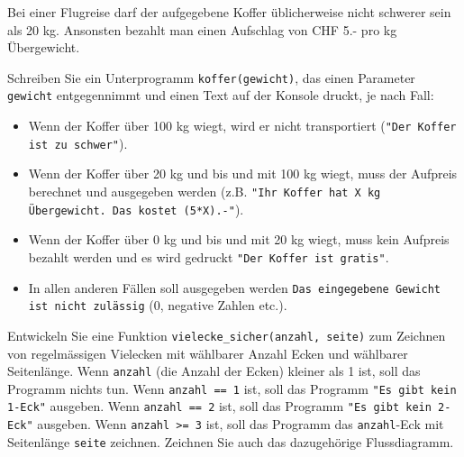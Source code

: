 \begin{myexercise}
	Bei einer Flugreise darf der aufgegebene Koffer üblicherweise nicht schwerer sein als 20 kg. Ansonsten bezahlt man einen Aufschlag von CHF 5.- pro kg Übergewicht.

	Schreiben Sie ein Unterprogramm \lstinline|koffer(gewicht)|, das einen Parameter \lstinline|gewicht| entgegennimmt und einen Text auf der Konsole druckt, je nach Fall:

	\begin{itemize}
		\item Wenn der Koffer über 100 kg wiegt, wird er nicht transportiert (\lstinline|"Der Koffer ist zu schwer"|).
		\item Wenn der Koffer über 20 kg und bis und mit 100 kg wiegt, muss der Aufpreis berechnet und ausgegeben werden (z.B. \lstinline|"Ihr Koffer hat X kg Übergewicht. Das kostet (5*X).-"|).
		\item Wenn der Koffer über 0 kg und bis und mit 20 kg wiegt, muss kein Aufpreis bezahlt werden und es wird gedruckt \lstinline|"Der Koffer ist gratis"|.
		\item  In allen anderen Fällen soll ausgegeben werden \lstinline|Das eingegebene Gewicht ist nicht zulässig| (0, negative Zahlen etc.).
	\end{itemize}
	\begin{myanswer}
		
	\end{myanswer}
\end{myexercise}

\begin{myexercise}
	Entwickeln Sie eine Funktion \lstinline|vielecke_sicher(anzahl, seite)| zum Zeichnen von regelmässigen Vielecken mit wählbarer Anzahl Ecken und wählbarer Seitenlänge. Wenn \lstinline|anzahl| (die Anzahl der Ecken) kleiner als 1 ist, soll das Programm nichts tun. Wenn \lstinline|anzahl == 1| ist, soll das Programm
	\lstinline|"Es gibt kein 1-Eck"| ausgeben. Wenn \lstinline|anzahl == 2| ist, soll das Programm
	\lstinline|"Es gibt kein 2-Eck"| ausgeben. Wenn \lstinline|anzahl >= 3| ist, soll das Programm das \lstinline|anzahl|-Eck mit Seitenlänge \lstinline|seite| zeichnen. Zeichnen Sie auch das dazugehörige Flussdiagramm.
	\begin{myanswer}
		
	\end{myanswer}
\end{myexercise}

